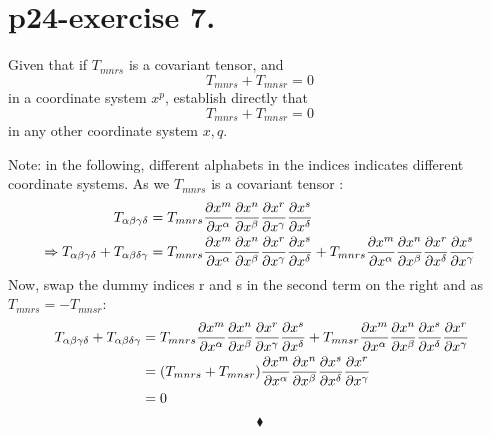 \section{p24-exercise 7.}
\begin{tcolorbox}
Given that if $T_{mnrs}$ is a covariant tensor, and 
$$ T_{mnrs}+T_{mnsr} = 0$$ in a coordinate system $x^{p}$, establish directly that $$ T^{,}_{mnrs}+T^{,}_{mnsr} = 0$$ in any other coordinate system $x{,q}$.
\end{tcolorbox}
Note: in the following, different alphabets in the indices indicates different coordinate systems.
As we $T_{mnrs}$ is a covariant tensor :
\begin{align}
\ T_{\alpha\beta\gamma\delta} &=  T_{mnrs}\pdv{x^{m}}{x^{\alpha}}\pdv{x^{n}}{x^{\beta}}\pdv{x^{r}}{x^{\gamma}}\pdv{x^{s}}{x^{\delta}}\\
\Rightarrow T_{\alpha\beta\gamma\delta}+T_{\alpha\beta\delta\gamma} &= T_{mnrs}\pdv{x^{m}}{x^{\alpha}}\pdv{x^{n}}{x^{\beta}}\pdv{x^{r}}{x^{\gamma}}\pdv{x^{s}}{x^{\delta}}+ T_{mnrs}\pdv{x^{m}}{x^{\alpha}}\pdv{x^{n}}{x^{\beta}}\pdv{x^{r}}{x^{\delta}}\pdv{x^{s}}{x^{\gamma}}
\end{align}
Now, swap the dummy indices r and s in the second term on the right and as $T_{mnrs} = - T_{mnsr}$:
\begin{align}
\ T_{\alpha\beta\gamma\delta}+T_{\alpha\beta\delta\gamma} &= T_{mnrs}\pdv{x^{m}}{x^{\alpha}}\pdv{x^{n}}{x^{\beta}}\pdv{x^{r}}{x^{\gamma}}\pdv{x^{s}}{x^{\delta}}+ T_{mnsr}\pdv{x^{m}}{x^{\alpha}}\pdv{x^{n}}{x^{\beta}}\pdv{x^{s}}{x^{\delta}}\pdv{x^{r}}{x^{\gamma}}\\
&= (T_{mnrs}+ T_{mnsr})\pdv{x^{m}}{x^{\alpha}}\pdv{x^{n}}{x^{\beta}}\pdv{x^{s}}{x^{\delta}}\pdv{x^{r}}{x^{\gamma}}\\&=0
\end{align}
$$\blacklozenge$$
\pagebreak[4]


